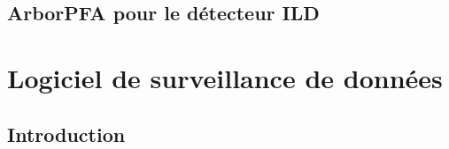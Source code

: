 \documentclass[8pt]{beamer}
\begin{document}
  \subsection{ArborPFA pour le détecteur ILD}

  \begin{frame}
  \frametitle{\secname}
  \framesubtitle{\subsecname}
  \end{frame}




  \section{Logiciel de surveillance de données}

  \begin{frame}
  \frametitle{\secname}
    \tableofcontents[currentsection]
  \end{frame}

  \subsection{Introduction}
\end{document}
